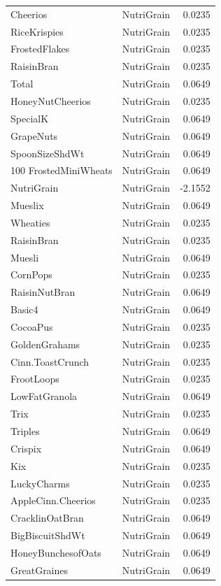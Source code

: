 \begin{longtable}{llr}
Cheerios & NutriGrain & 0.0235 \\
RiceKrispies & NutriGrain & 0.0235 \\
FrostedFlakes & NutriGrain & 0.0235 \\
RaisinBran & NutriGrain & 0.0235 \\
Total & NutriGrain & 0.0649 \\
HoneyNutCheerios & NutriGrain & 0.0235 \\
SpecialK & NutriGrain & 0.0649 \\
GrapeNuts & NutriGrain & 0.0649 \\
SpoonSizeShdWt & NutriGrain & 0.0649 \\
100%
FrostedMiniWheats & NutriGrain & 0.0649 \\
NutriGrain & NutriGrain & -2.1552 \\
Mueslix & NutriGrain & 0.0649 \\
Wheaties & NutriGrain & 0.0235 \\
RaisinBran & NutriGrain & 0.0235 \\
Muesli & NutriGrain & 0.0649 \\
CornPops & NutriGrain & 0.0235 \\
RaisinNutBran & NutriGrain & 0.0649 \\
Basic4 & NutriGrain & 0.0649 \\
CocoaPus & NutriGrain & 0.0235 \\
GoldenGrahams & NutriGrain & 0.0235 \\
Cinn.ToastCrunch & NutriGrain & 0.0235 \\
FrootLoops & NutriGrain & 0.0235 \\
LowFatGranola & NutriGrain & 0.0649 \\
Trix & NutriGrain & 0.0235 \\
Triples & NutriGrain & 0.0649 \\
Crispix & NutriGrain & 0.0649 \\
Kix & NutriGrain & 0.0235 \\
LuckyCharms & NutriGrain & 0.0235 \\
AppleCinn.Cheerios & NutriGrain & 0.0235 \\
CracklinOatBran & NutriGrain & 0.0649 \\
BigBiscuitShdWt & NutriGrain & 0.0649 \\
HoneyBunchesofOats & NutriGrain & 0.0649 \\
GreatGraines & NutriGrain & 0.0649 \\

\end{longtable}

